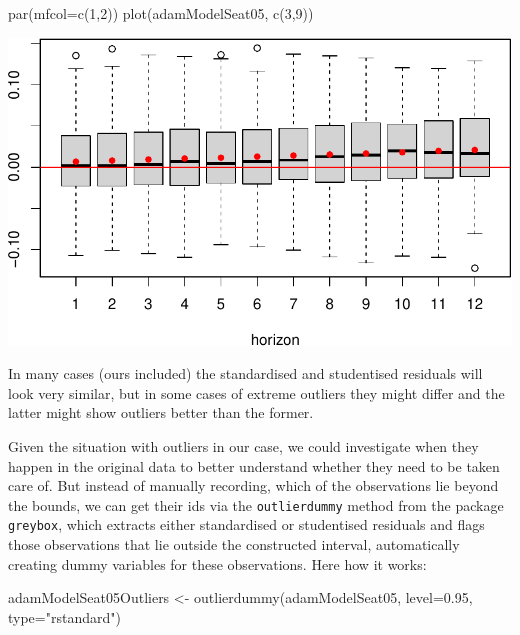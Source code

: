 \documentclass[
]{book}
\newenvironment{Shaded}{\begin{snugshade}}{\end{snugshade}}
\newcommand{\AttributeTok}[1]{\textcolor[rgb]{0.77,0.63,0.00}{#1}}
\newcommand{\DecValTok}[1]{\textcolor[rgb]{0.00,0.00,0.81}{#1}}
\newcommand{\FloatTok}[1]{\textcolor[rgb]{0.00,0.00,0.81}{#1}}
\newcommand{\FunctionTok}[1]{\textcolor[rgb]{0.00,0.00,0.00}{#1}}
\newcommand{\NormalTok}[1]{#1}
\newcommand{\OtherTok}[1]{\textcolor[rgb]{0.56,0.35,0.01}{#1}}
\newcommand{\StringTok}[1]{\textcolor[rgb]{0.31,0.60,0.02}{#1}}
\theoremstyle{definition}
\theoremstyle{definition}
\theoremstyle{definition}
\theoremstyle{definition}
\theoremstyle{remark}
\begin{document}
\begin{Shaded}
\begin{Highlighting}[]
\FunctionTok{par}\NormalTok{(}\AttributeTok{mfcol=}\FunctionTok{c}\NormalTok{(}\DecValTok{1}\NormalTok{,}\DecValTok{2}\NormalTok{))}
\FunctionTok{plot}\NormalTok{(adamModelSeat05, }\FunctionTok{c}\NormalTok{(}\DecValTok{3}\NormalTok{,}\DecValTok{9}\NormalTok{))}
\end{Highlighting}
\end{Shaded}

\includegraphics{adam_files/figure-latex/unnamed-chunk-136-1.pdf}

In many cases (ours included) the standardised and studentised residuals will look very similar, but in some cases of extreme outliers they might differ and the latter might show outliers better than the former.

Given the situation with outliers in our case, we could investigate when they happen in the original data to better understand whether they need to be taken care of. But instead of manually recording, which of the observations lie beyond the bounds, we can get their ids via the \texttt{outlierdummy} method from the package \texttt{greybox}, which extracts either standardised or studentised residuals and flags those observations that lie outside the constructed interval, automatically creating dummy variables for these observations. Here how it works:

\begin{Shaded}
\begin{Highlighting}[]
\NormalTok{adamModelSeat05Outliers }\OtherTok{\textless{}{-}}
  \FunctionTok{outlierdummy}\NormalTok{(adamModelSeat05,}
               \AttributeTok{level=}\FloatTok{0.95}\NormalTok{, }\AttributeTok{type=}\StringTok{"rstandard"}\NormalTok{)}
\end{Highlighting}
\end{Shaded}
\end{document}
